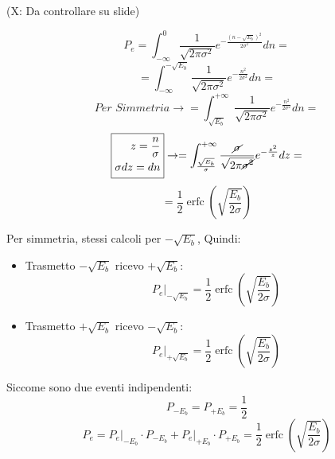 \documentclass{article}
\DeclareMathOperator\erfc{erfc}
\begin{document}
\begin{minipage}{0.45\textwidth}

    (X: Da controllare su slide)
\end{minipage}
\begin{minipage}{0.5\textwidth}
\[ P_e = \int^0_{-\infty} \frac{1}{\sqrt{2\pi \sigma^2}} e^{-\frac{(n - \sqrt{E_b})^2}{2\sigma^2}}dn =\]
\[ = \int^{-\sqrt{E_b}}_{-\infty}\frac{1}{\sqrt{2\pi \sigma^2}} e^{-\frac{n^2}{2\sigma^2}}dn =\]
\[ \textit{Per Simmetria} \rightarrow = \int^{+\infty}_{\sqrt{E_b}}  \frac{1}{\sqrt{2\pi \sigma^2}} e^{-\frac{n^2}{2\sigma^2}}dn =\]
\[\framebox{\(\begin{split}
    z = \frac{n}{\sigma}\\
    \sigma dz = dn
    \end{split} \)} \rightarrow =
    \int^{+\infty}_{\frac{\sqrt{E_b}}{\sigma}}  \frac{\cancel{\sigma}}{\sqrt{2\pi \cancel{\sigma^2}}} e^{-\frac{z^2}{z}}dz =\]
\[ = \frac{1}{2} \erfc\left(\sqrt{\frac{E_b}{2\sigma}}\right)\]
\end{minipage}

Per simmetria, stessi calcoli per $-\sqrt{E_b}$, Quindi:
\begin{itemize}
    \item Trasmetto $-\sqrt{E_b}$ ricevo $+\sqrt{E_b}$:
        \[ P_e \big|_{-\sqrt{E_b}} = \frac{1}{2} \erfc\left(\sqrt{\frac{E_b}{2\sigma}}\right)\]
    \item Trasmetto $+\sqrt{E_b}$ ricevo $-\sqrt{E_b}$:
        \[ P_e \big|_{+\sqrt{E_b}} = \frac{1}{2} \erfc\left(\sqrt{\frac{E_b}{2\sigma}}\right)\]
\end{itemize}
Siccome sono due eventi indipendenti:
\[ P_{-E_b} = P_{+E_b} = \frac{1}{2} \]
\[ P_e = P_e \big|_{-E_b} \cdot P_{-E_b} + P_e \big|_{+E_b} \cdot P_{+E_b}= \frac{1}{2} \erfc\left(\sqrt{\frac{E_b}{2\sigma}}\right) \]
\end{document}

